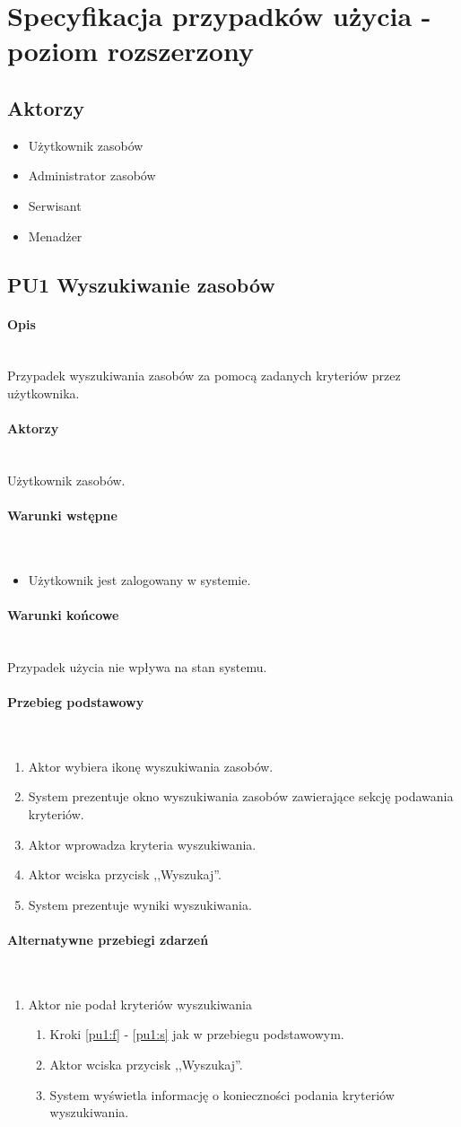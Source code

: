 \section{Specyfikacja przypadków użycia - poziom rozszerzony}
\newcommand{\myparagraph}[1]{\paragraph{#1}\mbox{}\\}

\subsection{Aktorzy}
\begin{itemize}
\item Użytkownik zasobów
\item Administrator zasobów
\item Serwisant
\item Menadżer
\end{itemize}


\subsection{PU1 Wyszukiwanie zasobów} \label{pu1}
\myparagraph{Opis}
Przypadek wyszukiwania zasobów za pomocą zadanych kryteriów przez użytkownika.

\myparagraph{Aktorzy}
Użytkownik zasobów.

\myparagraph{Warunki wstępne}
\begin{itemize}
\item Użytkownik jest zalogowany w systemie.
\end{itemize}

\myparagraph{Warunki końcowe}
Przypadek użycia nie wpływa na stan systemu.

\myparagraph{Przebieg podstawowy}
\begin{enumerate}
\item \label{pu1:f} Aktor wybiera ikonę wyszukiwania zasobów.
\item \label{pu1:s}System prezentuje okno wyszukiwania zasobów zawierające sekcję podawania kryteriów.
\item Aktor wprowadza kryteria wyszukiwania.
\item Aktor wciska przycisk ,,Wyszukaj''.
\item System prezentuje wyniki wyszukiwania.
\end{enumerate}

\myparagraph{Alternatywne przebiegi zdarzeń}
\begin{enumerate}
\item Aktor nie podał kryteriów wyszukiwania
	\begin{enumerate}[label*=\arabic*.]
	\item Kroki \ref{pu1:f} - \ref{pu1:s} jak w przebiegu podstawowym.
	\item Aktor wciska przycisk ,,Wyszukaj''.
	\item System wyświetla informację o konieczności podania kryteriów wyszukiwania.
	\end{enumerate}
\end{enumerate}

